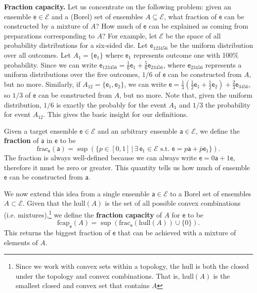 \documentclass[10pt,twocolumn, nofootinbib]{revtex4-2}
\newcommand\hull{\mathrm{hull}}
\newcommand\fraction{\mathrm{frac}}
\newcommand\frcap{\mathrm{fcap}}
\newcommand{\ens}[1][e] {\mathsf{#1}} %
\newcommand{\Ens}[1][E] {\mathcal{#1}} %
\begin{document}
\textbf{Fraction capacity.} Let us concentrate on the following problem: given an ensemble $\ens \in \Ens$ and a (Borel) set of ensembles $A \subseteq \Ens$, what fraction of $\ens$ can be constructed by a mixture of $A$? How much of $\ens$ can be explained as coming from preparations corresponding to $A$? For example, let $\Ens$ be the space of all probability distributions for a six-sided die. Let $\ens_{123456}$ be the uniform distribution over all outcomes. Let $A_1 = \{\ens_1\}$ where $\ens_1$ represents outcome one with 100\% probability. Since we can write $\ens_{123456} = \frac{1}{6} \ens_{1} + \frac{5}{6} \ens_{23456}$, where $\ens_{23456}$ represents a uniform distributions over the five outcomes, $1/6$ of $\ens$ can be constructed from $A$, but no more. Similarly, if $A_{12} = \{\ens_{1},\ens_{2}\}$, we can write $\ens = \frac{1}{3} \left(\frac{1}{2} \ens_1 + \frac{1}{2} \ens_2 \right)  + \frac{2}{3} \ens_{3456}$, so $1/3$ of $\ens$ can be constructed from $A$, but no more. Note that, given the uniform distribution, $1/6$ is exactly the probably for the event $A_1$ and $1/3$ the probability for event $A_{12}$. This gives the basic insight for our definitions.

Given a target ensemble $\ens \in \Ens$ and an arbitrary ensemble $\ens[a] \in \Ens$, we define the \textbf{fraction} of $\ens[a]$ in $\ens$ to be
\begin{equation}
	\fraction_{\ens}(\ens[a]) = \sup(\{ p \in [0,1] \, | \, \exists \, \ens_1 \in \Ens \text{ s.t. }  \ens = p \ens[a] + \bar{p} \ens_1 \}).
\end{equation}
The fraction is always well-defined because we can always write $\ens = 0 \ens[a] + 1 \ens$, therefore it must be zero or greater. This quantity tells us how much of ensemble $\ens$ can be constructed from $\ens[a]$. 

We now extend this idea from a single ensemble $\ens[a] \in \Ens$ to a Borel set of ensembles $A \subset \Ens$. Given that the $\hull(A)$ is the set of all possible convex combinations (i.e. mixtures),\footnote{Since we work with convex sets within a topology, the hull is both the closed under the topology and convex combinations. That is, $\hull(A)$ is the smallest closed and convex set that contains $A$} we define the \textbf{fraction capacity} of $A$ for $\ens$ to be
\begin{equation}
	\frcap_{\ens}(A) = \sup(\fraction_{\ens}(\hull(A))\cup\{0\}).
\end{equation}
This returns the biggest fraction of $\ens$ that can be achieved with a mixture of elements of $A$.
\end{document}
